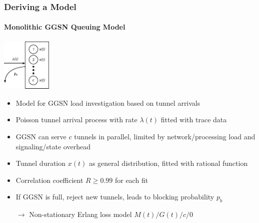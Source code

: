 \documentclass{beamer}
\begin{document}


\begin{frame}
	\frametitle{Deriving a Model}
	\framesubtitle{Monolithic GGSN Queuing Model}
		\begin{center}
			\includegraphics[height=2.5cm]{../../chapters/041-mobilenetsmeasuring/images/ggsn-monolithic.pdf}
		\end{center}

		\begin{itemize}
			\item Model for GGSN load investigation based on tunnel arrivals
			\item Poisson tunnel arrival process with rate $\lambda(t)$ fitted with trace data
			\item GGSN can serve $c$ tunnels in parallel, limited by network/processing load and signaling/state overhead
			\item Tunnel duration $x(t)$ as general distribution, fitted with rational function
			\item Correlation coefficient $R \geq 0.99$ for each fit
			\item If GGSN is full, reject new tunnels, leads to blocking probability $p_b$
			\item[$\rightarrow$] Non-stationary Erlang loss model $M(t)/G(t)/c/0$ 
		\end{itemize}

\end{frame}
\end{document}
